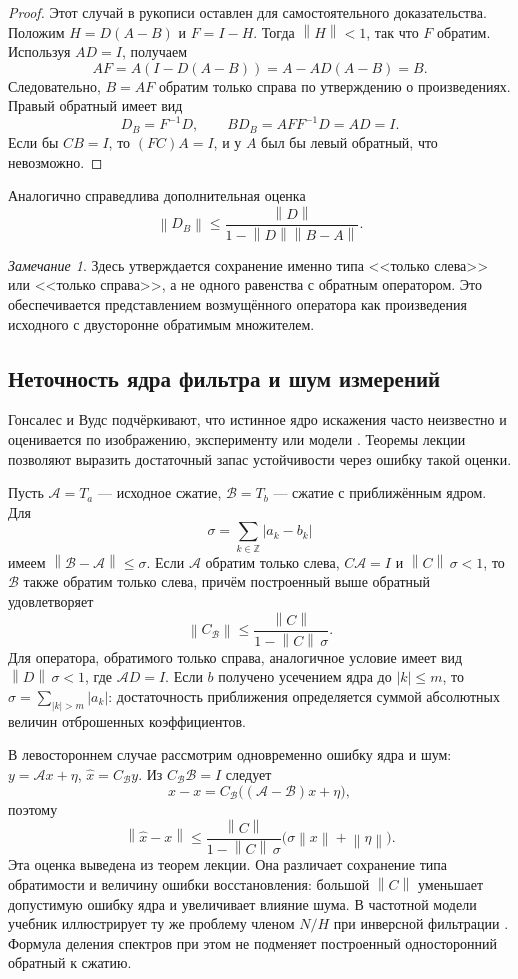 \documentclass[12pt,a4paper]{article}
\theoremstyle{definition}
\theoremstyle{remark}
\newtheorem*{remark}{Замечание}
\newcommand{\ZZ}{\mathbb{Z}}
\newcommand{\norm}[1]{\left\lVert #1\right\rVert}
\begin{document}
\begin{proof}
Этот случай в рукописи оставлен для самостоятельного доказательства.
Положим $H=D(A-B)$ и $F=I-H$. Тогда $\norm{H}<1$, так что $F$ обратим.
Используя $AD=I$, получаем
\[
  AF=A(I-D(A-B))=A-AD(A-B)=B.
\]
Следовательно, $B=AF$ обратим только справа по утверждению о
произведениях. Правый обратный имеет вид
\[
  D_B=F^{-1}D,\qquad BD_B=AFF^{-1}D=AD=I.
\]
Если бы $CB=I$, то $(FC)A=I$, и у $A$ был бы левый обратный,
что невозможно.
\end{proof}

Аналогично справедлива дополнительная оценка
\[
  \norm{D_B}\leqslant
  \frac{\norm{D}}{1-\norm{D}\norm{B-A}}.
\]

\begin{remark}
Здесь утверждается сохранение именно типа <<только слева>> или
<<только справа>>, а не одного равенства с обратным оператором.
Это обеспечивается представлением возмущённого оператора как
произведения исходного с двусторонне обратимым множителем.
\end{remark}

\subsection*{Неточность ядра фильтра и шум измерений}

Гонсалес и Вудс подчёркивают, что истинное ядро искажения часто
неизвестно и оценивается по изображению, эксперименту или модели
\cite[\S\,5.6, с.~406--408]{GW2012}.
Теоремы лекции позволяют выразить достаточный запас устойчивости
через ошибку такой оценки.

Пусть $\mathcal A=T_a$ --- исходное сжатие, $\mathcal B=T_b$ ---
сжатие с приближённым ядром. Для
\[
  \sigma=\sum_{k\in\ZZ}|a_k-b_k|
\]
имеем $\norm{\mathcal B-\mathcal A}\leqslant\sigma$.
Если $\mathcal A$ обратим только слева, $C\mathcal A=I$ и
$\norm C\,\sigma<1$, то $\mathcal B$ также обратим только слева,
причём построенный выше обратный удовлетворяет
\[
  \norm{C_{\mathcal B}}
  \leqslant\frac{\norm C}{1-\norm C\,\sigma}.
\]
Для оператора, обратимого только справа, аналогичное условие
имеет вид $\norm D\,\sigma<1$, где $\mathcal A D=I$.
Если $b$ получено усечением ядра до $|k|\leqslant m$, то
$\sigma=\sum_{|k|>m}|a_k|$: достаточность приближения определяется
суммой абсолютных величин отброшенных коэффициентов.

В левостороннем случае рассмотрим одновременно ошибку ядра и шум:
$y=\mathcal A x+\eta$, $\widehat x=C_{\mathcal B}y$.
Из $C_{\mathcal B}\mathcal B=I$ следует
\[
  \widehat x-x
    =C_{\mathcal B}\bigl((\mathcal A-\mathcal B)x+\eta\bigr),
\]
поэтому
\[
  \boxed{\norm{\widehat x-x}
    \leqslant\frac{\norm C}{1-\norm C\,\sigma}
       \bigl(\sigma\norm x+\norm\eta\bigr)}.
\]
Эта оценка выведена из теорем лекции. Она различает сохранение
типа обратимости и величину ошибки восстановления: большой
$\norm C$ уменьшает допустимую ошибку ядра и увеличивает влияние шума.
В частотной модели учебник иллюстрирует ту же проблему членом
$N/H$ при инверсной фильтрации
\cite[\S\,5.7, с.~412]{GW2012}.
Формула деления спектров при этом не подменяет построенный
односторонний обратный к сжатию.
\end{document}

